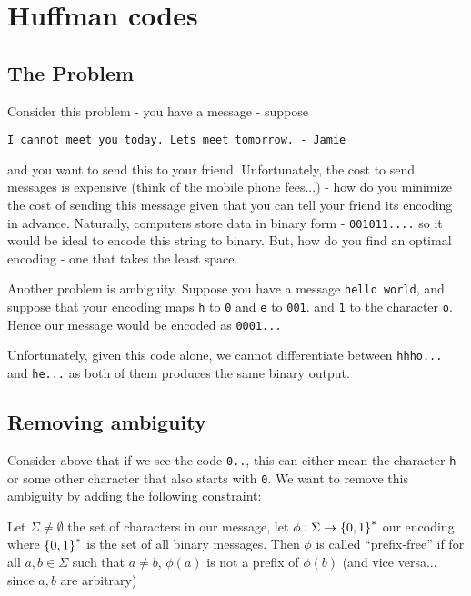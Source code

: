 \section{Huffman codes}

\subsection{The Problem}

Consider this problem - you have a message - suppose 

\begin{center}
\texttt{I cannot meet you today. Lets meet tomorrow. - Jamie}
\end{center}

and you want to send this to your friend. 
Unfortunately, the cost to send messages is expensive (think of the mobile phone fees...) - how do you minimize the cost of sending this message given that you can tell your friend its encoding in advance.
Naturally, computers store data in binary form - \texttt{001011....} so it would be ideal to encode this string to binary. But, how do you find an optimal encoding - one that takes the least space.

Another problem is ambiguity. Suppose you have a message \texttt{hello world}, and suppose that your encoding maps \texttt{h} to \texttt{0} and \texttt{e} to \texttt{001}. and \texttt{1} to the character \texttt{o}. 
Hence our message would be encoded as 
\texttt{0001...}

Unfortunately, given this code alone, we cannot differentiate between \texttt{hhho...} and \texttt{he...} as both of them produces the same binary output. 

\subsection{Removing ambiguity}

Consider above that if we see the code \texttt{0..}, this can either mean the character \texttt{h} or some other character that also starts with \texttt{0}. We want to remove this ambiguity by adding the following constraint:

\begin{define}
    Let $\Sigma \neq \emptyset$ the set of characters in our message, let $\phi: \Sigma \to \cbr{0, 1}^*$ our encoding where $\cbr{0, 1}^*$ is the set of all binary messages. 
    Then $\phi$ is called ``prefix-free'' if for all $a, b \in \Sigma$ such that $a \neq b$, $\phi(a)$ is not a prefix of $\phi(b)$ (and vice versa... since $a, b$ are arbitrary)
\end{define}

